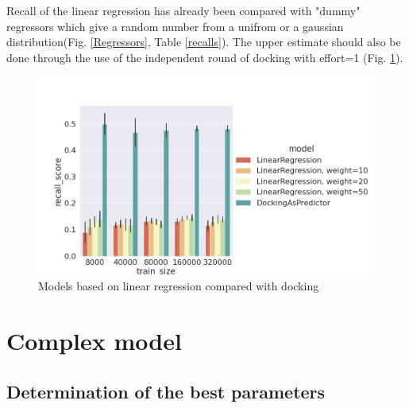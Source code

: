 Recall of the linear regression has already been compared with "dummy" regressors which give a random number from a unifrom or a gaussian distribution(Fig. \ref{Regressors}, Table \ref{recalls}).
The upper estimate should also be done through the use of the independent round of docking with effort=1 (Fig. \ref{linregVSdocking}).

\begin{figure}[H]
\includegraphics[scale = 0.45]{Images/LRvsD.jpg}
\caption{Models based on linear regression compared with docking}
\label{linregVSdocking}
\end{figure}

\section{Complex model}

\subsection{Determination of the best parameters}

